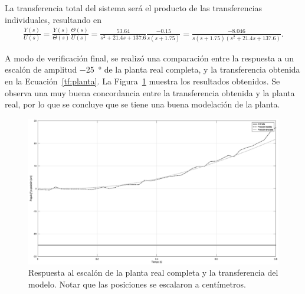 La transferencia total del sistema será el producto de las transferencias individuales, resultando en
\begin{align}
    \label{tf:planta}
    \frac{Y(s)}{U(s)} = \frac{Y(s)}{\Theta(s)} \frac{\Theta(s)}{U(s)}
        = \frac{53.64}{s^2 + 21.4 s + 137.6} \frac{-0.15}{s(s+1.75)}
        = \frac{-8.046}{s (s+1.75) (s^2 + 21.4 s + 137.6)}.
\end{align}

A modo de verificación final, se realizó una comparación entre la respuesta a un escalón de amplitud \qty{-25}{\degree} de la planta real completa, y la transferencia obtenida en la Ecuación~\eqref{tf:planta}. La Figura~\ref{fig:step-planta} muestra los resultados obtenidos. Se observa una muy buena concordancia entre la transferencia obtenida y la planta real, por lo que se concluye que se tiene una buena modelación de la planta.

\begin{figure}[!tbp]
    \centering
    \includegraphics[width=\linewidth]{img/step-planta.eps}
    \caption{Respuesta al escalón de la planta real completa y la transferencia del modelo. Notar que las posiciones se escalaron a centímetros.}
    \label{fig:step-planta}
\end{figure}

